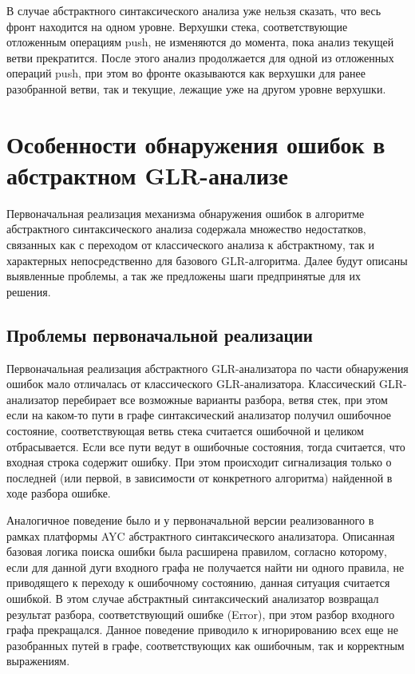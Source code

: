 \documentclass{matmex-diploma}
\begin{document}
В случае абстрактного синтаксического анализа уже нельзя сказать, что весь фронт 
находится на одном уровне. Верхушки стека, соответствующие отложенным операциям 
push, не изменяются до момента, пока анализ текущей ветви прекратится. После этого 
анализ продолжается для одной из отложенных операций push, при этом во фронте 
оказываются как верхушки для ранее разобранной ветви, так и текущие, лежащие уже 
на другом уровне верхушки.


\section{Особенности обнаружения ошибок в абстрактном GLR-анализе}
Первоначальная реализация механизма обнаружения ошибок в алгоритме абстрактного 
синтаксического анализа содержала множество недостатков, связанных как с переходом 
от классического анализа к абстрактному, так и характерных непосредственно для 
базового GLR-алгоритма. Далее будут описаны выявленные проблемы, а так же предложены 
шаги предпринятые для их решения.

\subsection{Проблемы первоначальной реализации}
Первоначальная реализация абстрактного GLR-анализатора по части обнаружения ошибок 
мало отличалась от классического GLR-анализатора. Классический GLR-анализатор 
перебирает все возможные варианты разбора, ветвя стек, при этом если на каком-то 
пути в графе синтаксический анализатор получил ошибочное  состояние, соответствующая 
ветвь стека считается ошибочной и целиком отбрасывается. Если все пути ведут в 
ошибочные состояния, тогда считается, что входная строка содержит ошибку. При этом 
происходит сигнализация только о последней (или первой, в зависимости от конкретного 
алгоритма) найденной в ходе разбора ошибке. 

Аналогичное поведение было и у первоначальной версии реализованного в рамках 
платформы AYC абстрактного синтаксического анализатора. Описанная базовая логика 
поиска ошибки была расширена правилом, согласно которому, если для данной дуги 
входного графа не получается найти ни одного правила, не приводящего к переходу 
к ошибочному состоянию, данная ситуация считается ошибкой. В этом случае абстрактный 
синтаксический анализатор возвращал результат разбора, соответствующий ошибке 
(Error), при этом разбор входного графа прекращался. Данное поведение приводило 
к игнорированию всех еще не разобранных путей в графе, соответствующих как ошибочным, 
так и корректным выражениям. 
\end{document}

